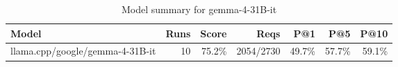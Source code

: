 \begin{table}[htbp]
\centering
\begin{tabular}{lrrrrrr}
\toprule
Model & Runs & Score & Reqs & P@1 & P@5 & P@10 \\
\midrule
llama.cpp/google/gemma-4-31B-it & 10 & 75.2\% & 2054/2730 & 49.7\% & 57.7\% & 59.1\% \\
\bottomrule
\end{tabular}
\caption{Model summary for gemma-4-31B-it}
\end{table}
